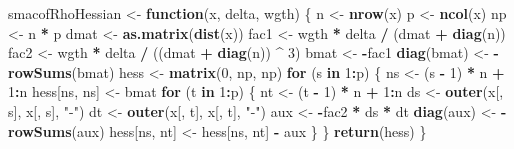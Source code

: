 \documentclass[
  12pt,
]{article}
\newenvironment{Shaded}{\begin{snugshade}}{\end{snugshade}}
\newcommand{\ControlFlowTok}[1]{\textcolor[rgb]{0.13,0.29,0.53}{\textbf{#1}}}
\newcommand{\DecValTok}[1]{\textcolor[rgb]{0.00,0.00,0.81}{#1}}
\newcommand{\FunctionTok}[1]{\textcolor[rgb]{0.13,0.29,0.53}{\textbf{#1}}}
\newcommand{\NormalTok}[1]{#1}
\newcommand{\OtherTok}[1]{\textcolor[rgb]{0.56,0.35,0.01}{#1}}
\newcommand{\SpecialCharTok}[1]{\textcolor[rgb]{0.81,0.36,0.00}{\textbf{#1}}}
\newcommand{\StringTok}[1]{\textcolor[rgb]{0.31,0.60,0.02}{#1}}
\begin{document}
\begin{Shaded}
\begin{Highlighting}[]
\NormalTok{smacofRhoHessian }\OtherTok{\textless{}{-}} \ControlFlowTok{function}\NormalTok{(x, delta, wgth) \{}
\NormalTok{  n }\OtherTok{\textless{}{-}} \FunctionTok{nrow}\NormalTok{(x)}
\NormalTok{  p }\OtherTok{\textless{}{-}} \FunctionTok{ncol}\NormalTok{(x)}
\NormalTok{  np }\OtherTok{\textless{}{-}}\NormalTok{ n }\SpecialCharTok{*}\NormalTok{ p}
\NormalTok{  dmat }\OtherTok{\textless{}{-}} \FunctionTok{as.matrix}\NormalTok{(}\FunctionTok{dist}\NormalTok{(x))}
\NormalTok{  fac1 }\OtherTok{\textless{}{-}}\NormalTok{ wgth }\SpecialCharTok{*}\NormalTok{ delta }\SpecialCharTok{/}\NormalTok{ (dmat }\SpecialCharTok{+} \FunctionTok{diag}\NormalTok{(n))}
\NormalTok{  fac2 }\OtherTok{\textless{}{-}}\NormalTok{ wgth }\SpecialCharTok{*}\NormalTok{ delta }\SpecialCharTok{/}\NormalTok{ ((dmat }\SpecialCharTok{+} \FunctionTok{diag}\NormalTok{(n)) }\SpecialCharTok{\^{}} \DecValTok{3}\NormalTok{)}
\NormalTok{  bmat }\OtherTok{\textless{}{-}} \SpecialCharTok{{-}}\NormalTok{fac1}
  \FunctionTok{diag}\NormalTok{(bmat) }\OtherTok{\textless{}{-}} \SpecialCharTok{{-}}\FunctionTok{rowSums}\NormalTok{(bmat)}
\NormalTok{  hess }\OtherTok{\textless{}{-}} \FunctionTok{matrix}\NormalTok{(}\DecValTok{0}\NormalTok{, np, np)}
  \ControlFlowTok{for}\NormalTok{ (s }\ControlFlowTok{in} \DecValTok{1}\SpecialCharTok{:}\NormalTok{p) \{}
\NormalTok{    ns }\OtherTok{\textless{}{-}}\NormalTok{ (s }\SpecialCharTok{{-}} \DecValTok{1}\NormalTok{) }\SpecialCharTok{*}\NormalTok{ n }\SpecialCharTok{+} \DecValTok{1}\SpecialCharTok{:}\NormalTok{n}
\NormalTok{    hess[ns, ns] }\OtherTok{\textless{}{-}}\NormalTok{ bmat}
    \ControlFlowTok{for}\NormalTok{ (t }\ControlFlowTok{in} \DecValTok{1}\SpecialCharTok{:}\NormalTok{p) \{}
\NormalTok{      nt }\OtherTok{\textless{}{-}}\NormalTok{ (t }\SpecialCharTok{{-}} \DecValTok{1}\NormalTok{) }\SpecialCharTok{*}\NormalTok{ n }\SpecialCharTok{+} \DecValTok{1}\SpecialCharTok{:}\NormalTok{n}
\NormalTok{      ds }\OtherTok{\textless{}{-}} \FunctionTok{outer}\NormalTok{(x[, s], x[, s], }\StringTok{"{-}"}\NormalTok{)}
\NormalTok{      dt }\OtherTok{\textless{}{-}} \FunctionTok{outer}\NormalTok{(x[, t], x[, t], }\StringTok{"{-}"}\NormalTok{)}
\NormalTok{      aux }\OtherTok{\textless{}{-}} \SpecialCharTok{{-}}\NormalTok{fac2 }\SpecialCharTok{*}\NormalTok{ ds }\SpecialCharTok{*}\NormalTok{ dt}
      \FunctionTok{diag}\NormalTok{(aux) }\OtherTok{\textless{}{-}} \SpecialCharTok{{-}}\FunctionTok{rowSums}\NormalTok{(aux)}
\NormalTok{      hess[ns, nt] }\OtherTok{\textless{}{-}}\NormalTok{ hess[ns, nt] }\SpecialCharTok{{-}}\NormalTok{ aux}
\NormalTok{    \}}
\NormalTok{  \}}
  \FunctionTok{return}\NormalTok{(hess)}
\NormalTok{\}}


\end{Highlighting}
\end{Shaded}
\end{document}
